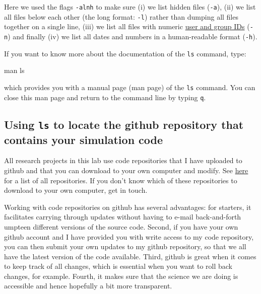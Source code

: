 \documentclass[
]{book}
\newenvironment{Shaded}{\begin{snugshade}}{\end{snugshade}}
\newcommand{\FunctionTok}[1]{\textcolor[rgb]{0.00,0.00,0.00}{#1}}
\newcommand{\NormalTok}[1]{#1}
\begin{document}
Here we used the flags \texttt{-alnh} to make sure (i) we list hidden files (\texttt{-a}), (ii) we list all files below each other (the long format: \texttt{-l}) rather than dumping all files together on a single line, (iii) we list all files with numeric \href{https://en.wikipedia.org/wiki/User_identifier}{user and group IDs} (\texttt{-n}) and finally (iv) we list all dates and numbers in a human-readable format (\texttt{-h}).

If you want to know more about the documentation of the \texttt{ls} command, type:

\begin{Shaded}
\begin{Highlighting}[]
\FunctionTok{man}\NormalTok{ ls}
\end{Highlighting}
\end{Shaded}

which provides you with a manual page (man page) of the \texttt{ls} command. You can close this man page and return to the command line by typing \texttt{q}.

\hypertarget{using-ls-to-locate-the-github-repository-that-contains-your-simulation-code}{%
\subsection{\texorpdfstring{Using \texttt{ls} to locate the github repository that contains your simulation code}{Using ls to locate the github repository that contains your simulation code}}\label{using-ls-to-locate-the-github-repository-that-contains-your-simulation-code}}

All research projects in this lab use code repositories that I have uploaded to github and that you can download to your own computer and modify. See \href{https://github.com/bramkuijper}{here} for a list of all repositories. If you don't know which of these repositories to download to your own computer, get in touch.

Working with code repositories on github has several advantages: for starters, it facilitates carrying through updates without having to e-mail back-and-forth umpteen different versions of the source code. Second, if you have your own github account and I have provided you with write access to my code repository, you can then submit your own updates to my github repository, so that we all have the latest version of the code available. Third, github is great when it comes to keep track of all changes, which is essential when you want to roll back changes, for example. Fourth, it makes sure that the science we are doing is accessible and hence hopefully a bit more transparent.
\end{document}
